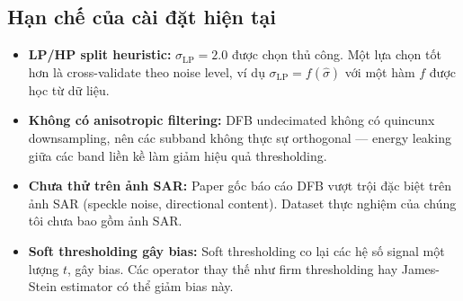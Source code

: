 \subsection{Hạn chế của cài đặt hiện tại}

\begin{itemize}
    \item \textbf{LP/HP split heuristic:} $\sigma_\text{LP} = 2.0$ được chọn thủ công. Một lựa chọn tốt hơn là cross-validate theo noise level, ví dụ $\sigma_\text{LP} = f(\hat{\sigma})$ với một hàm $f$ được học từ dữ liệu.
    \item \textbf{Không có anisotropic filtering:} DFB undecimated không có quincunx downsampling, nên các subband không thực sự orthogonal --- energy leaking giữa các band liền kề làm giảm hiệu quả thresholding.
    \item \textbf{Chưa thử trên ảnh SAR:} Paper gốc \cite{rosiles2000} báo cáo DFB vượt trội đặc biệt trên ảnh SAR (speckle noise, directional content). Dataset thực nghiệm của chúng tôi chưa bao gồm ảnh SAR.
    \item \textbf{Soft thresholding gây bias:} Soft thresholding co lại các hệ số signal một lượng $t$, gây bias. Các operator thay thế như firm thresholding hay James-Stein estimator có thể giảm bias này.
\end{itemize}
